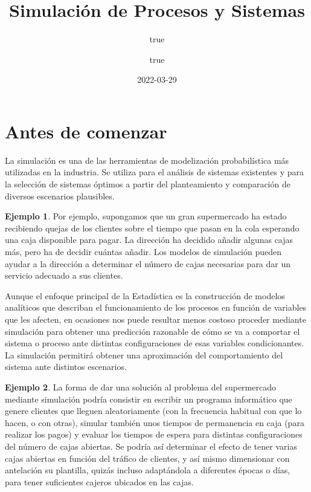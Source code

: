 \documentclass[
]{book}
\title{Simulación de Procesos y Sistemas}
\author{true \and true}
\date{2022-03-29}
\newenvironment{whitebox}{
  \definecolor{shadecolor}{rgb}{255, 255, 255}  
  \color{black}
  \begin{shaded}}
 {\end{shaded}}
\theoremstyle{definition}
\theoremstyle{definition}
\newtheorem{example}{Ejemplo}[chapter]
\theoremstyle{definition}
\theoremstyle{definition}
\theoremstyle{remark}
\begin{document}
\maketitle

{
\setcounter{tocdepth}{1}
\tableofcontents
}
\hypertarget{antes-de-comenzar}{%
\chapter*{Antes de comenzar}\label{antes-de-comenzar}}

La simulación es una de las herramientas de modelización probabilística más utilizadas en la industria. Se utiliza para el análisis de sistemas existentes y para la selección de sistemas óptimos a partir del planteamiento y comparación de diversos escenarios plausibles.

\begin{whitebox}

\begin{example}
Por ejemplo, supongamos que un gran supermercado ha estado recibiendo quejas de los clientes sobre el tiempo que pasan en la cola esperando una caja disponible para pagar. La dirección ha decidido añadir algunas cajas más, pero ha de decidir cuántas añadir. Los modelos de simulación pueden ayudar a la dirección a determinar el número de cajas necesarias para dar un servicio adecuado a sus clientes.
\end{example}

\end{whitebox}

Aunque el enfoque principal de la Estadística es la construcción de modelos analíticos que describan el funcionamiento de los procesos en función de variables que les afecten, en ocasiones nos puede resultar menos costoso proceder mediante simulación para obtener una predicción razonable de cómo se va a comportar el sistema o proceso ante distintas configuraciones de esas variables condicionantes. La simulación permitirá obtener una aproximación del comportamiento del sistema ante distintos escenarios.

\begin{whitebox}

\begin{example}
La forma de dar una solución al problema del supermercado mediante simulación podría consistir en escribir un programa informático que genere clientes que lleguen aleatoriamente (con la frecuencia habitual con que lo hacen, o con otras), simular también unos tiempos de permanencia en caja (para realizar los pagos) y evaluar los tiempos de espera para distintas configuraciones del número de cajas abiertas. Se podría así determinar el efecto de tener varias cajas abiertas en función del tráfico de clientes, y así mismo dimensionar con antelación su plantilla, quizás incluso adaptándola a diferentes épocas o días, para tener suficientes cajeros ubicados en las cajas.
\end{example}

\end{whitebox}
\end{document}
